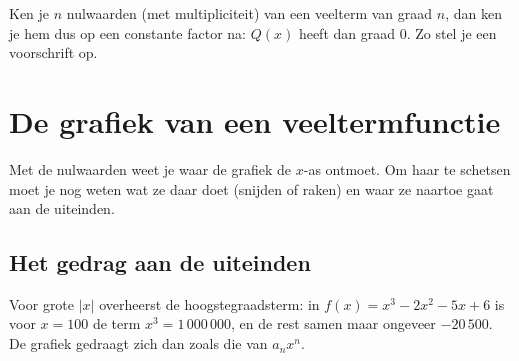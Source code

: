 Ken je $n$ nulwaarden (met multipliciteit) van een veelterm van graad $n$, dan ken je hem dus op een constante factor na: $Q(x)$ heeft dan graad $0$. Zo stel je een voorschrift op.


\begin{oefeningen}
\end{oefeningen}

\section{De grafiek van een veeltermfunctie}

Met de nulwaarden weet je waar de grafiek de $x$-as ontmoet. Om haar te schetsen moet je nog weten wat ze daar doet (snijden of raken) en waar ze naartoe gaat aan de uiteinden.

\subsection{Het gedrag aan de uiteinden}

Voor grote $|x|$ overheerst de hoogstegraadsterm: in $f(x) = x^3 - 2x^2 - 5x + 6$ is voor $x = 100$ de term $x^3 = 1\,000\,000$, en de rest samen maar ongeveer $-20\,500$. De grafiek gedraagt zich dan zoals die van $a_n x^n$.

